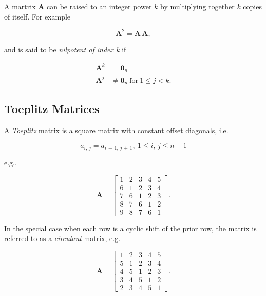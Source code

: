 \documentclass[graybox,envcountchap,sectrefs]{svmono}\usepackage[]{graphicx}\usepackage[]{xcolor}
\begin{document}
\begin{appendices}
A martrix $\mathrm{\mathbf{A}}$ can be raised to an integer power
$k$ by multiplying together $k$ copies of itself. For example

\begin{equation}
\mathrm{\mathbf{A}}^{2}=\mathrm{\mathbf{A}}\,\mathrm{\mathbf{A}},\label{eq:ASquared}
\end{equation}

and is said to be \emph{nilpotent of index k} if

\begin{subequations}
\begin{align}
\mathrm{\mathbf{A}}^{k} & =\mathbf{0}_{n}\label{eq:NilpotentMatrixA}\\
\mathrm{\mathbf{A}}^{j} & \ne\mathbf{0}_{n}\ \mathrm{for}\ 1\leqslant j<k.\label{eq:NilpotentMatrixB}
\end{align}
\end{subequations}


\subsection{Toeplitz Matrices}

A \emph{Toeplitz} matrix is a square matrix with constant offset diagonals,
i.e.

\begin{equation}
a_{i,\,j}=a_{i\,+\,1,\,j\,+\,1},\ 1\leqslant i,\,j\leqslant n-1\label{eq:ToeplitzMatrix1}
\end{equation}

e.g.,

\begin{equation}
\mathrm{\mathbf{A}}=\left[\begin{array}{ccccc}
1 & 2 & 3 & 4 & 5\\
6 & 1 & 2 & 3 & 4\\
7 & 6 & 1 & 2 & 3\\
8 & 7 & 6 & 1 & 2\\
9 & 8 & 7 & 6 & 1
\end{array}\right].\label{eq:ToeplitzMatrix2}
\end{equation}

In the special case when each row is a cyclic shift of the prior row,
the matrix is referred to as a \emph{circulant} matrix, e.g.

\begin{equation}
\mathrm{\mathbf{A}}=\left[\begin{array}{ccccc}
1 & 2 & 3 & 4 & 5\\
5 & 1 & 2 & 3 & 4\\
4 & 5 & 1 & 2 & 3\\
3 & 4 & 5 & 1 & 2\\
2 & 3 & 4 & 5 & 1
\end{array}\right].\label{eq:CirculantMatrix}
\end{equation}


\end{appendices}
\end{document}
